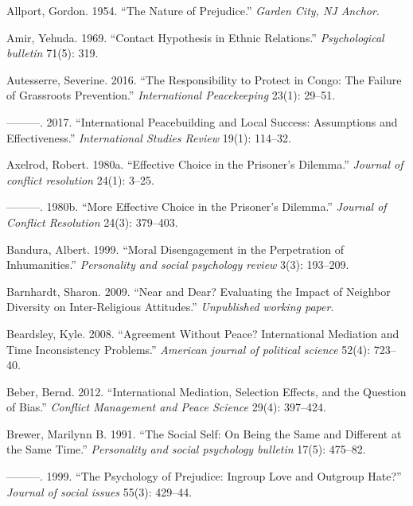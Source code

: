 \documentclass[11pt]{article}
\begin{document}
\leavevmode\hypertarget{ref-allport1954prejudice}{}%
Allport, Gordon. 1954. ``The Nature of Prejudice.'' \emph{Garden City,
NJ Anchor}.

\leavevmode\hypertarget{ref-amir1969contact}{}%
Amir, Yehuda. 1969. ``Contact Hypothesis in Ethnic Relations.''
\emph{Psychological bulletin} 71(5): 319.

\leavevmode\hypertarget{ref-autesserre2016failure}{}%
Autesserre, Severine. 2016. ``The Responsibility to Protect in Congo:
The Failure of Grassroots Prevention.'' \emph{International
Peacekeeping} 23(1): 29--51.

\leavevmode\hypertarget{ref-autesserre2017international}{}%
---------. 2017. ``International Peacebuilding and Local Success:
Assumptions and Effectiveness.'' \emph{International Studies Review}
19(1): 114--32.

\leavevmode\hypertarget{ref-axelrod1980effective}{}%
Axelrod, Robert. 1980a. ``Effective Choice in the Prisoner's Dilemma.''
\emph{Journal of conflict resolution} 24(1): 3--25.

\leavevmode\hypertarget{ref-axelrod1980more}{}%
---------. 1980b. ``More Effective Choice in the Prisoner's Dilemma.''
\emph{Journal of Conflict Resolution} 24(3): 379--403.

\leavevmode\hypertarget{ref-bandura1999moral}{}%
Bandura, Albert. 1999. ``Moral Disengagement in the Perpetration of
Inhumanities.'' \emph{Personality and social psychology review} 3(3):
193--209.

\leavevmode\hypertarget{ref-barnhardt2009near}{}%
Barnhardt, Sharon. 2009. ``Near and Dear? Evaluating the Impact of
Neighbor Diversity on Inter-Religious Attitudes.'' \emph{Unpublished
working paper}.

\leavevmode\hypertarget{ref-beardsley2008agreement}{}%
Beardsley, Kyle. 2008. ``Agreement Without Peace? International
Mediation and Time Inconsistency Problems.'' \emph{American journal of
political science} 52(4): 723--40.

\leavevmode\hypertarget{ref-beber2012international}{}%
Beber, Bernd. 2012. ``International Mediation, Selection Effects, and
the Question of Bias.'' \emph{Conflict Management and Peace Science}
29(4): 397--424.

\leavevmode\hypertarget{ref-brewer1991social}{}%
Brewer, Marilynn B. 1991. ``The Social Self: On Being the Same and
Different at the Same Time.'' \emph{Personality and social psychology
bulletin} 17(5): 475--82.

\leavevmode\hypertarget{ref-brewer1999ingroupOutgroup}{}%
---------. 1999. ``The Psychology of Prejudice: Ingroup Love and
Outgroup Hate?'' \emph{Journal of social issues} 55(3): 429--44.
\end{document}
